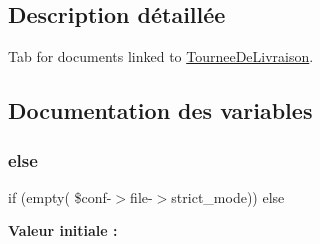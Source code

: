 \subsection{Description détaillée}
Tab for documents linked to \hyperlink{classTourneeDeLivraison}{Tournee\+De\+Livraison}. 



\subsection{Documentation des variables}
\mbox{\label{tourneedelivraison__document_8php_aff326962ca0f1945836a0c4ca5f0be08}} 
\subsubsection{\texorpdfstring{else}{else}}
{\footnotesize\ttfamily if (empty( \$conf-\/$>$file-\/$>$strict\+\_\+mode)) else}

{\bfseries Valeur initiale \+:}
